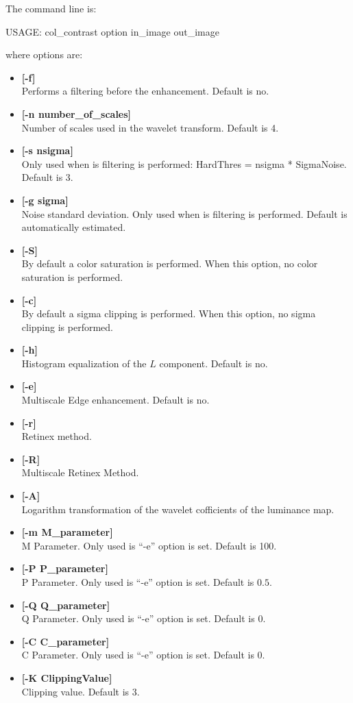 The command line is:
{\bf
\begin{center}
 USAGE: col\_contrast option in\_image out\_image
\end{center}}
where options are:
\begin{itemize}
\baselineskip=0.4truecm
\itemsep=0.1truecm
\item {\bf [-f]} \\
 Performs a filtering before the enhancement. Default is no.
\item {\bf [-n number\_of\_scales]} \\
Number of scales used in the wavelet transform.
Default is 4. 
\item {\bf [-s nsigma]} \\
 Only used when is filtering is performed: HardThres = nsigma * SigmaNoise.
Default is 3.
\item {\bf [-g sigma]} \\
Noise standard deviation. Only used when is filtering is performed.
Default is automatically estimated.
\item {\bf [-S]} \\
By default a color saturation is performed. When this option, no
color saturation is performed.
\item {\bf [-c]} \\
By default a sigma clipping is performed. When this option, no
sigma clipping is performed.
\item {\bf [-h]} \\
Histogram equalization of the $L$ component. Default is no.
\item {\bf [-e]} \\
Multiscale Edge enhancement. Default is no.
\item {\bf [-r]} \\
Retinex method.
\item {\bf [-R]} \\
Multiscale Retinex Method.
\item {\bf [-A]} \\
Logarithm transformation of the wavelet cofficients of the luminance map.

\item {\bf [-m M\_parameter]} \\
M Parameter. Only used is ``-e'' option is set. 
Default is 100.
\item {\bf [-P P\_parameter]} \\
P Parameter. Only used is ``-e'' option is set. 
Default is $0.5$.
\item {\bf [-Q Q\_parameter]} \\ 
Q Parameter. Only used is ``-e'' option is set. 
Default is $0$.
\item {\bf [-C C\_parameter]} \\  
C Parameter. Only used is ``-e'' option is set. 
Default is $0$.
\item {\bf [-K ClippingValue]} \\
Clipping value. Default is 3.
\end{itemize}

